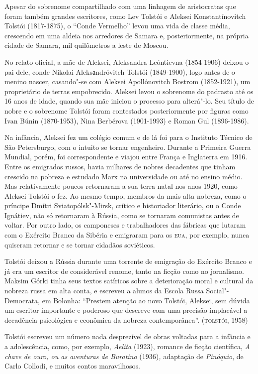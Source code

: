 \documentclass[11pt]{extarticle}
\begin{document}
Apesar do sobrenome compartilhado com uma linhagem de aristocratas que
foram também grandes escritores, como Lev Tolstói e Aleksei
Konstantínovitch Tolstói (1817-1875), o ``Conde Vermelho'' levou uma
vida de classe média, crescendo em uma aldeia nos arredores de Samara e,
posteriormente, na própria cidade de Samara, mil quilômetros a leste de
Moscou.

No relato oficial, a mãe de Aleksei, Aleksandra Leóntievna (1854-1906)
deixou o pai dele, conde Nikolai Aleksаndróvitch Tolstói (1849-1900),
logo antes de o menino nascer, casando"-se com Aleksei Apollónovitch
Bostrom (1852-1921), um proprietário de terras empobrecido. Aleksei
levou o sobrenome do padrasto até os 16 anos de idade, quando sua mãe
iniciou o processo para alterá"-lo. Seu título de nobre e o sobrenome
Tolstói foram contestados posteriormente por figuras como Ivan Búnin
(1870-1953), Nina Berbérova (1901-1993) e Roman Gul (1896-1986).

Na infância, Aleksei fez um
colégio comum e de lá foi para o Instituto Técnico de São Petersburgo,
com o intuito se tornar engenheiro. Durante a Primeira Guerra Mundial,
porém, foi correspondente e viajou entre França e Inglaterra em
1916. Entre os emigrados russos,
havia milhares de nobres decadentes que tinham crescido na pobreza e
estudado Marx na universidade ou até no ensino médio. Mas relativamente
poucos retornaram a sua terra natal nos anos 1920, como Aleksei Tolstói
o fez. Ao mesmo tempo, membros da mais alta nobreza, como o príncipe
Dmítri Sviatopólsk"-Mirsk, crítico e historiador literário, ou o Conde
Ignátiev, não só retornaram à Rússia, como se tornaram comunistas antes
de voltar. Por outro lado, os camponeses e trabalhadores das fábricas
que lutaram com o Exército Branco da Sibéria e emigraram para os \textsc{eua},
por exemplo, nunca quiseram retornar e se tornar cidadãos soviéticos.

Tolstói deixou a Rússia durante uma torrente de emigração do Exército
Branco e já era um escritor de considerável renome, tanto na ficção como
no jornalismo. Maksim Górki tinha seus textos satíricos sobre a
deterioração moral e cultural da nobreza russa em alta conta, e escreveu
a alunos da Escola Russa Social"-Democrata, em Bolonha: ``Prestem atenção
ao novo Tolstói, Aleksei, sem dúvida um escritor importante e poderoso
que descreve com uma precisão implacável a decadência psicológica e
econômica da nobreza contemporânea''. (\textsc{tolstói}, 1958)

Tolstói escreveu um número nada desprezível de obras voltadas para a
infância e a adolescência, como, por exemplo, \emph{Aelita} (1923),
romance de ficção científica, \emph{A chave de ouro, ou as
aventuras de Buratino} (1936)\emph{,} adaptação de \emph{Pinóquio}, de
Carlo Collodi, e muitos contos maravilhosos.
\end{document}
